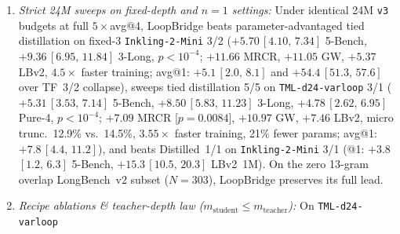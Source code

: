 \documentclass[11pt]{article}
\newcommand{\ci}[2]{\,{\scriptsize\ensuremath{[#1,\,#2]}}}
\begin{document}
\begin{enumerate}
$\{4/3, 4/2, 3/2\}$) simultaneously serves all three operating points without reloading: 4/3 reaches 73.8\% (98.6\% of
4/4, \#1 GPQA 83.2\% \& GW 54.6\% among $n{=}3$; $-0.30$\ci{-1.60}{0.98}, $p{=}0.67$ vs.\ dedicated full-synth 4/3 KV),
\textbf{3/2 reaches 69.8\%} (\#1 $r{=}0$ arm at $n{=}2$: $+2.93$\ci{1.39}{4.46}, $p{=}0.0004$ and $+4.64$\ci{2.43}{6.91}
3-Long, $p{<}10^{-4}$ vs.\ Orig~2/2; $+2.80$\ci{1.24}{4.42}, $p{=}0.0004$ vs.\ KV-Only~2/2; $+1.79$\ci{0.42}{3.17},
$p{=}0.013$ vs.\ 0\%-nosynth KV-Only~2/2; vs.\ $4.3\times$-larger Distilled~2/2: directional $+0.90$\ci{-0.56}{2.37}
5-Bench [$p{=}0.21$], $+1.90$ 3-Long [$p{=}0.067$], $+4.39$ MRCR [$p{=}0.068$], and significant $+2.34$\ci{0.60}{4.13}
on 1M LBv2 [$p{=}0.0072$]; 25\% cheaper prefill and concurrent GPQA eval rate 245.4 vs.\ 244.8~tok/s with 9\% shorter
CoTs, 8.2K vs.\ 9.0K tok), and 4/2 reaches 68.4\% (sweeps Orig~2/2 5/5, $+1.52$\ci{-0.21}{3.25}, $p{=}0.088$; $-0.32$,
$p{=}0.72$ vs.\ dedicated 0\%-nosynth 4/2). Under shared 6M/cell training, 3/2 exceeds 4/2 ($+1.41$\ci{-0.12}{2.97}
5-Bench [$p{=}0.073$], $+2.51$\ci{0.33}{4.72} 3-Long [$p{=}0.028$]) because $m{=}3$ is \texttt{TML-d24-varloop}'s native
post-training depth capturing 83\% of the native 2/2--4/4 MRCR jump ($72.6\to 90.4$ vs.\ 94.0) with only a 1-pass bridge
($3{\to}2$), whereas 4/2 shares \texttt{k\_post["2"]} and 3/4 \texttt{k\_loop["2"]} slots with 3/2 under half the
dedicated budget.
\item \emph{Strict 24M sweeps on fixed-depth and $n{=}1$ settings:} Under identical 24M \texttt{v3} budgets at full $5\times$avg@4, LoopBridge
beats parameter-advantaged tied distillation on fixed-3 \texttt{Inkling-2-Mini} 3/2 ($+5.70$\ci{4.10}{7.34} 5-Bench,
$+9.36$\ci{6.95}{11.84} 3-Long, $p{<}10^{-4}$; $+11.66$ MRCR, $+11.05$ GW, $+5.37$ LBv2, $4.5\times$ faster training;
avg@1: $+5.1$\ci{2.0}{8.1} and $+54.4$\ci{51.3}{57.6} over TF~3/2 collapse), sweeps tied distillation 5/5 on
\texttt{TML-d24-varloop} 3/1 ($+5.31$\ci{3.53}{7.14} 5-Bench, $+8.50$\ci{5.83}{11.23} 3-Long, $+4.78$\ci{2.62}{6.95}
Pure-4, $p{<}10^{-4}$; $+7.09$ MRCR [$p{=}0.0084$], $+10.97$ GW, $+7.46$ LBv2, micro trunc.\ 12.9\% vs.\ 14.5\%,
$3.55\times$ faster training, 21\% fewer params; avg@1: $+7.8$\ci{4.4}{11.2}), and beats Distilled~1/1 on
\texttt{Inkling-2-Mini} 3/1 (@1: $+3.8$\ci{1.2}{6.3} 5-Bench, $+15.3$\ci{10.5}{20.3} LBv2~1M). On the zero 13-gram
overlap LongBench~v2 subset ($N{=}303$), LoopBridge preserves its full lead.
\item \emph{Recipe ablations \& teacher-depth law ($m_{\text{student}}\le m_{\text{teacher}}$):} On \texttt{TML-d24-varloop}

\end{enumerate}
\end{document}
